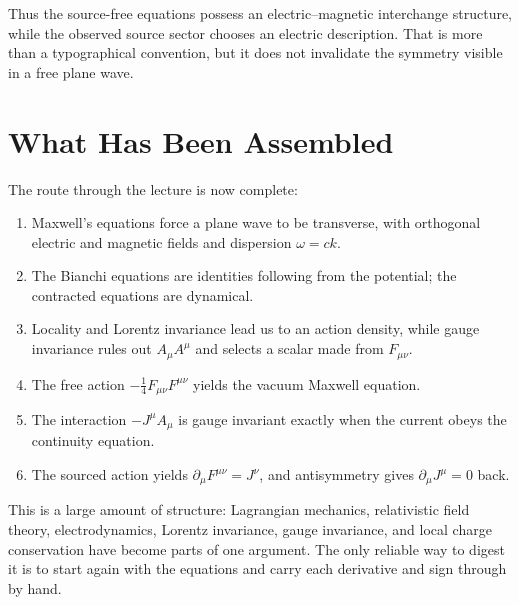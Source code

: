 Thus the source-free equations possess an electric--magnetic interchange
structure, while the observed source sector chooses an electric
description. That is more than a typographical convention, but it does
not invalidate the symmetry visible in a free plane wave.

\section{What Has Been Assembled}

The route through the lecture is now complete:
\begin{enumerate}
\item Maxwell's equations force a plane wave to be transverse, with
      orthogonal electric and magnetic fields and dispersion
      \(\omega=ck\).
\item The Bianchi equations are identities following from the potential;
      the contracted equations are dynamical.
\item Locality and Lorentz invariance lead us to an action density, while
      gauge invariance rules out \(A_\mu A^\mu\) and selects a scalar made
      from \(F_{\mu\nu}\).
\item The free action
      \(-\tfrac14F_{\mu\nu}F^{\mu\nu}\) yields the vacuum Maxwell
      equation.
\item The interaction \(-J^\mu A_\mu\) is gauge invariant exactly when
      the current obeys the continuity equation.
\item The sourced action yields
      \(\partial_\mu F^{\mu\nu}=J^\nu\), and antisymmetry gives
      \(\partial_\mu J^\mu=0\) back.
\end{enumerate}

This is a large amount of structure: Lagrangian mechanics, relativistic
field theory, electrodynamics, Lorentz invariance, gauge invariance, and
local charge conservation have become parts of one argument. The only
reliable way to digest it is to start again with the equations and carry
each derivative and sign through by hand.

